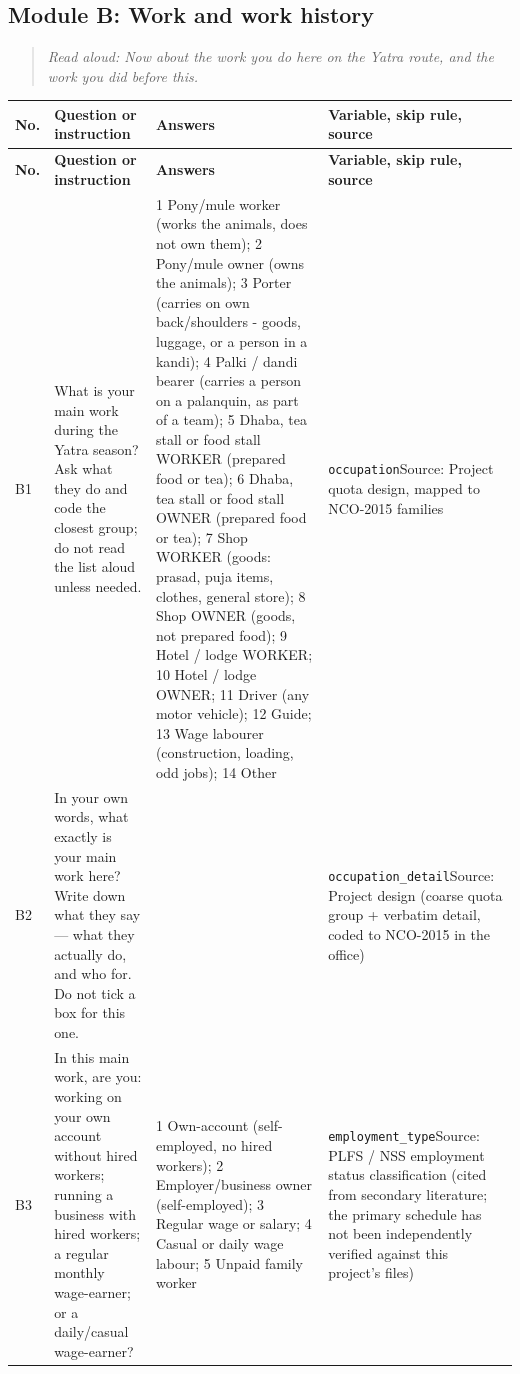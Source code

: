 \documentclass[10pt]{article}
\begin{document}
\subsection*{Module B: Work and work history}
\begin{quote}\small\textit{Read aloud: Now about the work you do here on the Yatra route, and the work you did before this.}\end{quote}
{\scriptsize
\begin{longtable}{p{0.8cm}p{6.4cm}p{3.6cm}p{5.8cm}}
\toprule
\textbf{No.} & \textbf{Question or instruction} & \textbf{Answers} & \textbf{Variable, skip rule, source} \\
\midrule
\endfirsthead
\toprule
\textbf{No.} & \textbf{Question or instruction} & \textbf{Answers} & \textbf{Variable, skip rule, source} \\
\midrule
\endhead
B1 & What is your main work during the Yatra season? Ask what they do and code the closest group; do not read the list aloud unless needed. & 1 Pony/mule worker (works the animals, does not own them); 2 Pony/mule owner (owns the animals); 3 Porter (carries on own back/shoulders - goods, luggage, or a person in a kandi); 4 Palki / dandi bearer (carries a person on a palanquin, as part of a team); 5 Dhaba, tea stall or food stall WORKER (prepared food or tea); 6 Dhaba, tea stall or food stall OWNER (prepared food or tea); 7 Shop WORKER (goods: prasad, puja items, clothes, general store); 8 Shop OWNER (goods, not prepared food); 9 Hotel / lodge WORKER; 10 Hotel / lodge OWNER; 11 Driver (any motor vehicle); 12 Guide; 13 Wage labourer (construction, loading, odd jobs); 14 Other & \texttt{occupation}\newline Source: Project quota design, mapped to NCO-2015 families \\
B2 & In your own words, what exactly is your main work here? Write down what they say — what they actually do, and who for. Do not tick a box for this one. &  & \texttt{occupation\_detail}\newline Source: Project design (coarse quota group + verbatim detail, coded to NCO-2015 in the office) \\
B3 & In this main work, are you: working on your own account without hired workers; running a business with hired workers; a regular monthly wage-earner; or a daily/casual wage-earner? & 1 Own-account (self-employed, no hired workers); 2 Employer/business owner (self-employed); 3 Regular wage or salary; 4 Casual or daily wage labour; 5 Unpaid family worker & \texttt{employment\_type}\newline Source: PLFS / NSS employment status classification (cited from secondary literature; the primary schedule has not been independently verified against this project's files) \\

\end{longtable}}
\end{document}
